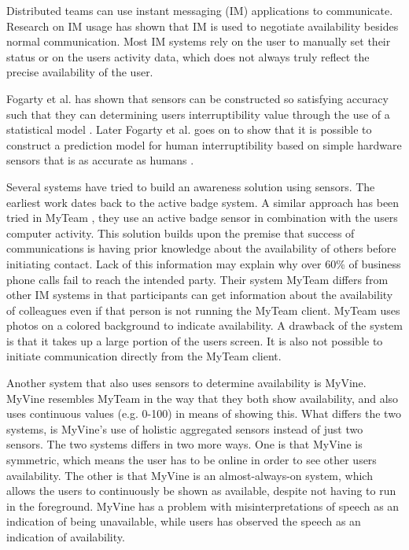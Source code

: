 \documentclass{sigchi}
\begin{document}
Distributed teams can use instant messaging (IM) applications to communicate. Research on IM usage \cite{nardi2000interaction}\cite{handel2002chat}\cite{tang2001connexus} has shown that IM is used to negotiate availability besides normal communication. Most IM systems rely on the user to manually set their status or on the users activity data, which does not always truly reflect the precise availability of the user.

 Fogarty et al. has shown that sensors can be constructed so satisfying accuracy such that they can determining users interruptibility value through the use of a statistical model \cite{fogarty2004examining}.  Later Fogarty et al. goes on to show that it is possible to construct a prediction model for human interruptibility based on simple hardware sensors that is as accurate as humans \cite{Fogarty:2005:PHI:1057237.1057243}.

Several systems have tried to build an awareness solution using sensors. The earliest work dates back to the active badge system\cite{want1992active}. A similar approach has been tried in MyTeam \cite{lai2003myteam}, they use an active badge sensor in combination with the users computer activity. This solution builds upon the premise that success of communications is having prior knowledge about the availability of others before initiating contact. Lack of this information may explain why over 60\% of business phone calls fail to reach the intended party\cite{whittaker1995rethinking}.
Their system MyTeam differs from other IM systems in that participants can get information about the availability of colleagues even if that person is not running the MyTeam client. MyTeam uses photos on a colored background to indicate availability. A drawback of the system is that it takes up a large portion of the users screen. It is also not possible to initiate communication directly from the MyTeam client.

Another system that also uses sensors to determine availability is MyVine. MyVine resembles MyTeam in the way that they both show availability, and also uses continuous values (e.g. 0-100) in means of showing this. What differs the two systems, is MyVine’s use of holistic aggregated sensors instead of just two sensors. The two systems differs in two more ways. One is that MyVine is symmetric, which means the user has to be online in order to see other users availability. The other is that MyVine is an almost-always-on system, which allows the users to continuously be shown as available, despite not having to run in the foreground.
MyVine has a problem with misinterpretations of speech as an indication of being unavailable, while users has observed the speech as an indication of availability.
\end{document}
